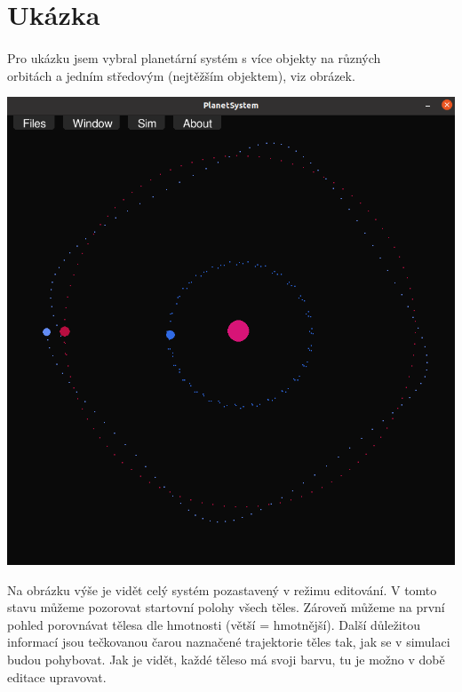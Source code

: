 \documentclass[a4paper, 12pt]{article}
\begin{document}
\newpage
\section{Ukázka}
\paragraph{}
Pro ukázku jsem vybral planetární systém s více objekty na různých \\orbitách a
jedním středovým (nejtěžším objektem), viz obrázek.

\begin{center}
\includegraphics[width=0.9\linewidth]{pics/p4_crop.png}
\end{center}

Na obrázku výše je vidět celý systém pozastavený v režimu editování. V tomto
stavu můžeme pozorovat startovní polohy všech těles. Zároveň můžeme na první
pohled porovnávat tělesa dle hmotnosti (větší = hmotnější). Další důležitou
informací jsou tečkovanou čarou naznačené trajektorie těles tak, jak se v
simulaci budou pohybovat. Jak je vidět, každé těleso má svoji barvu, tu je
možno v době editace upravovat.
\pagebreak
\end{document}
